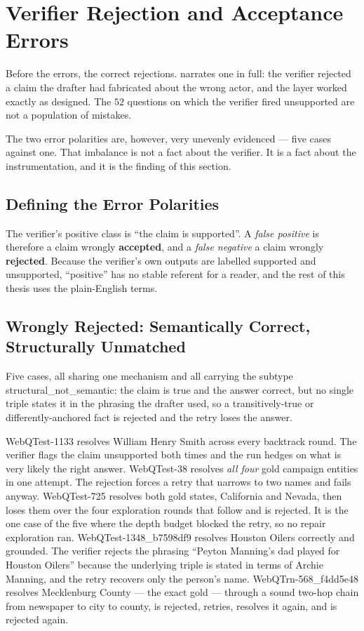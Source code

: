 \section{Verifier Rejection and Acceptance Errors}\label{sec:verifier-errors}

Before the errors, the correct rejections.  narrates
one in full: the verifier rejected a claim the drafter had fabricated about the
wrong actor, and the layer worked exactly as designed. The $52$ questions on
which the verifier fired \textsf{unsupported} are not a population of mistakes.

The two error polarities are, however, very unevenly evidenced --- five cases
against one. That imbalance is not a fact about the verifier. It is a
fact about the instrumentation, and it is the finding of this section.

\subsection{Defining the Error Polarities}\label{sec:polarities}

The verifier's positive class is ``the claim is supported''. A \emph{false
positive} is therefore a claim wrongly \textbf{accepted}, and a \emph{false
negative} a claim wrongly \textbf{rejected}. Because the verifier's own outputs
are labelled \textsf{supported} and \textsf{unsupported}, ``positive'' has no
stable referent for a reader, and the rest of this thesis uses the plain-English
terms.

\subsection{Wrongly Rejected: Semantically Correct, Structurally Unmatched}

Five cases, all sharing one mechanism and all carrying the subtype
\textsf{structural\_not\_semantic}: the claim is true and the answer correct,
but no single triple states it in the phrasing the drafter used, so a
transitively-true or differently-anchored fact is rejected and the retry loses
the answer.

\textsf{WebQTest-1133} resolves \textsf{William Henry Smith} across every
backtrack round. The verifier flags the claim unsupported both times and the run
hedges on what is very likely the right answer. \textsf{WebQTest-38} resolves
\emph{all four} gold campaign entities in one attempt. The rejection forces a
retry that narrows to two names and fails anyway. \textsf{WebQTest-725} resolves
both gold states, California and Nevada, then loses them over the four
exploration rounds that follow and is rejected. It is the one case of the five
where the depth budget blocked the retry, so no repair exploration ran.
\textsf{WebQTest-1348\_b7598df9} resolves \textsf{Houston Oilers} correctly and
grounded. The verifier rejects the phrasing ``Peyton Manning's dad played for
Houston Oilers'' because the underlying triple is stated in terms of Archie
Manning, and the retry recovers only the person's name.
\textsf{WebQTrn-568\_f4dd5e48} resolves \textsf{Mecklenburg County} --- the
exact gold --- through a sound two-hop chain from newspaper to city to county,
is rejected, retries, resolves it again, and is rejected again.


